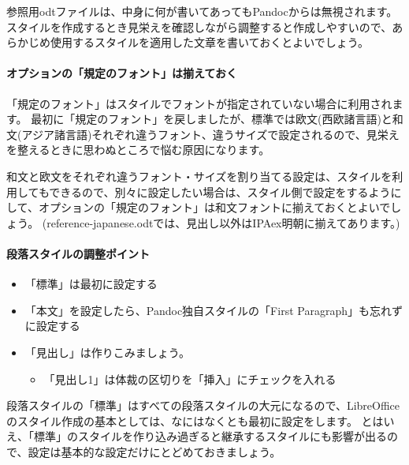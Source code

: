 \documentclass[]{article}
\providecommand{\tightlist}{%
  \setlength{\itemsep}{0pt}\setlength{\parskip}{0pt}}
\let\oldparagraph\paragraph
\renewcommand{\paragraph}[1]{\oldparagraph{#1}\mbox{}}
\begin{document}
参照用odtファイルは、中身に何が書いてあってもPandocからは無視されます。
スタイルを作成するとき見栄えを確認しながら調整すると作成しやすいので、あらかじめ使用するスタイルを適用した文章を書いておくとよいでしょう。

\paragraph{オプションの「規定のフォント」は揃えておく}\label{ux30aaux30d7ux30b7ux30e7ux30f3ux306eux898fux5b9aux306eux30d5ux30a9ux30f3ux30c8ux306fux63c3ux3048ux3066ux304aux304f}

「規定のフォント」はスタイルでフォントが指定されていない場合に利用されます。
最初に「規定のフォント」を戻しましたが、標準では欧文(西欧諸言語)と和文(アジア諸言語)それぞれ違うフォント、違うサイズで設定されるので、見栄えを整えるときに思わぬところで悩む原因になります。

和文と欧文をそれぞれ違うフォント・サイズを割り当てる設定は、スタイルを利用してもできるので、別々に設定したい場合は、スタイル側で設定をするようにして、オプションの「規定のフォント」は和文フォントに揃えておくとよいでしょう。
(reference-japanese.odtでは、見出し以外はIPAex明朝に揃えてあります。)

\paragraph{段落スタイルの調整ポイント}\label{ux6bb5ux843dux30b9ux30bfux30a4ux30ebux306eux8abfux6574ux30ddux30a4ux30f3ux30c8}

\begin{itemize}
\item
  「標準」は最初に設定する
\item
  「本文」を設定したら、Pandoc独自スタイルの「First
  Paragraph」も忘れずに設定する
\item
  「見出し」は作りこみましょう。

  \begin{itemize}
  \tightlist
  \item
    「見出し1」は体裁の区切りを「挿入」にチェックを入れる
  \end{itemize}
\end{itemize}

段落スタイルの「標準」はすべての段落スタイルの大元になるので、LibreOfficeのスタイル作成の基本としては、なにはなくとも最初に設定をします。
とはいえ、「標準」のスタイルを作り込み過ぎると継承するスタイルにも影響が出るので、設定は基本的な設定だけにとどめておきましょう。
\end{document}
